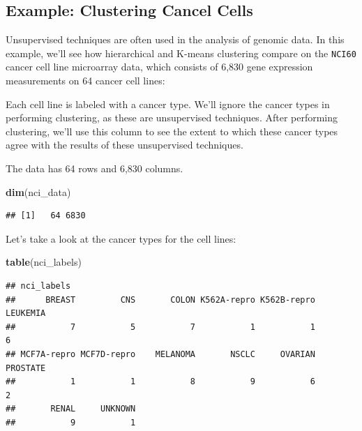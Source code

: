 \documentclass[
  openany]{book}
\newenvironment{Shaded}{\begin{snugshade}}{\end{snugshade}}
\newcommand{\CommentTok}[1]{\textcolor[rgb]{0.56,0.35,0.01}{\textit{#1}}}
\newcommand{\KeywordTok}[1]{\textcolor[rgb]{0.13,0.29,0.53}{\textbf{#1}}}
\newcommand{\NormalTok}[1]{#1}
\newcommand{\OperatorTok}[1]{\textcolor[rgb]{0.81,0.36,0.00}{\textbf{#1}}}
\newcommand{\StringTok}[1]{\textcolor[rgb]{0.31,0.60,0.02}{#1}}
\begin{document}
\hypertarget{example-clustering-cancel-cells}{%
\subsection{Example: Clustering Cancel Cells}\label{example-clustering-cancel-cells}}

Unsupervised techniques are often used in the analysis of genomic data. In this example, we'll see how hierarchical and K-means clustering compare on the \texttt{NCI60} cancer cell line microarray data, which
consists of 6,830 gene expression measurements on 64 cancer cell lines:

\begin{Shaded}
\end{Shaded}

Each cell line is labeled with a cancer type. We'll ignore the
cancer types in performing clustering, as these are unsupervised
techniques. After performing clustering, we'll use this column to see the extent to which these cancer types agree with the results of these
unsupervised techniques.

The data has 64 rows and 6,830 columns.

\begin{Shaded}
\begin{Highlighting}[]
\KeywordTok{dim}\NormalTok{(nci_data)}
\end{Highlighting}
\end{Shaded}

\begin{verbatim}
## [1]   64 6830
\end{verbatim}

Let's take a look at the cancer types for the cell lines:

\begin{Shaded}
\begin{Highlighting}[]
\KeywordTok{table}\NormalTok{(nci_labels)}
\end{Highlighting}
\end{Shaded}

\begin{verbatim}
## nci_labels
##      BREAST         CNS       COLON K562A-repro K562B-repro    LEUKEMIA 
##           7           5           7           1           1           6 
## MCF7A-repro MCF7D-repro    MELANOMA       NSCLC     OVARIAN    PROSTATE 
##           1           1           8           9           6           2 
##       RENAL     UNKNOWN 
##           9           1
\end{verbatim}
\end{document}
